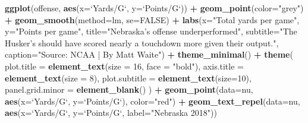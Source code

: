 \documentclass[
]{book}
\newenvironment{Shaded}{\begin{snugshade}}{\end{snugshade}}
\newcommand{\DataTypeTok}[1]{\textcolor[rgb]{0.13,0.29,0.53}{#1}}
\newcommand{\DecValTok}[1]{\textcolor[rgb]{0.00,0.00,0.81}{#1}}
\newcommand{\KeywordTok}[1]{\textcolor[rgb]{0.13,0.29,0.53}{\textbf{#1}}}
\newcommand{\NormalTok}[1]{#1}
\newcommand{\OperatorTok}[1]{\textcolor[rgb]{0.81,0.36,0.00}{\textbf{#1}}}
\newcommand{\OtherTok}[1]{\textcolor[rgb]{0.56,0.35,0.01}{#1}}
\newcommand{\StringTok}[1]{\textcolor[rgb]{0.31,0.60,0.02}{#1}}
\begin{document}
\begin{Shaded}
\begin{Highlighting}[]
\KeywordTok{ggplot}\NormalTok{(offense, }\KeywordTok{aes}\NormalTok{(}\DataTypeTok{x=}\StringTok{`}\DataTypeTok{Yards/G}\StringTok{`}\NormalTok{, }\DataTypeTok{y=}\StringTok{`}\DataTypeTok{Points/G}\StringTok{`}\NormalTok{)) }\OperatorTok{+}\StringTok{ }
\StringTok{  }\KeywordTok{geom_point}\NormalTok{(}\DataTypeTok{color=}\StringTok{"grey"}\NormalTok{) }\OperatorTok{+}\StringTok{ }\KeywordTok{geom_smooth}\NormalTok{(}\DataTypeTok{method=}\NormalTok{lm, }\DataTypeTok{se=}\OtherTok{FALSE}\NormalTok{) }\OperatorTok{+}\StringTok{ }
\StringTok{  }\KeywordTok{labs}\NormalTok{(}\DataTypeTok{x=}\StringTok{"Total yards per game"}\NormalTok{, }\DataTypeTok{y=}\StringTok{"Points per game"}\NormalTok{, }\DataTypeTok{title=}\StringTok{"Nebraska's offense underperformed"}\NormalTok{, }\DataTypeTok{subtitle=}\StringTok{"The Husker's should have scored nearly a touchdown more given their output."}\NormalTok{, }\DataTypeTok{caption=}\StringTok{"Source: NCAA | By Matt Waite"}\NormalTok{) }\OperatorTok{+}\StringTok{ }
\StringTok{  }\KeywordTok{theme_minimal}\NormalTok{() }\OperatorTok{+}\StringTok{ }
\StringTok{  }\KeywordTok{theme}\NormalTok{(}
    \DataTypeTok{plot.title =} \KeywordTok{element_text}\NormalTok{(}\DataTypeTok{size =} \DecValTok{16}\NormalTok{, }\DataTypeTok{face =} \StringTok{"bold"}\NormalTok{),}
    \DataTypeTok{axis.title =} \KeywordTok{element_text}\NormalTok{(}\DataTypeTok{size =} \DecValTok{8}\NormalTok{), }
    \DataTypeTok{plot.subtitle =} \KeywordTok{element_text}\NormalTok{(}\DataTypeTok{size=}\DecValTok{10}\NormalTok{), }
    \DataTypeTok{panel.grid.minor =} \KeywordTok{element_blank}\NormalTok{()}
\NormalTok{    ) }\OperatorTok{+}
\StringTok{  }\KeywordTok{geom_point}\NormalTok{(}\DataTypeTok{data=}\NormalTok{nu, }\KeywordTok{aes}\NormalTok{(}\DataTypeTok{x=}\StringTok{`}\DataTypeTok{Yards/G}\StringTok{`}\NormalTok{, }\DataTypeTok{y=}\StringTok{`}\DataTypeTok{Points/G}\StringTok{`}\NormalTok{), }\DataTypeTok{color=}\StringTok{"red"}\NormalTok{) }\OperatorTok{+}\StringTok{ }
\StringTok{  }\KeywordTok{geom_text_repel}\NormalTok{(}\DataTypeTok{data=}\NormalTok{nu, }\KeywordTok{aes}\NormalTok{(}\DataTypeTok{x=}\StringTok{`}\DataTypeTok{Yards/G}\StringTok{`}\NormalTok{, }\DataTypeTok{y=}\StringTok{`}\DataTypeTok{Points/G}\StringTok{`}\NormalTok{, }\DataTypeTok{label=}\StringTok{"Nebraska 2018"}\NormalTok{))}
\end{Highlighting}
\end{Shaded}
\end{document}
